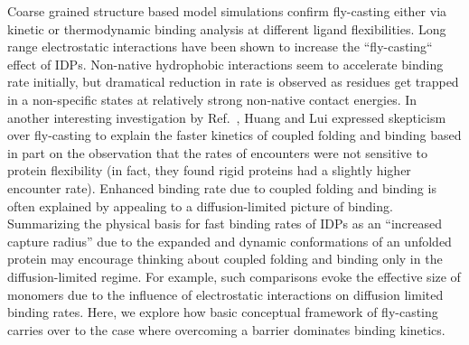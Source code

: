 \documentclass[../talant.diss.submit.tex]{subfiles}
\begin{document}
Coarse grained structure based model simulations\cite{levy:05,okazaki:06} confirm fly-casting either via kinetic or
thermodynamic binding analysis at different ligand flexibilities.
\cite{turjanski:08,huang:09,levy:04}
Long range electrostatic interactions have been shown to increase the ``fly-casting`` effect of IDPs.\cite{levy:07}
Non-native hydrophobic interactions seem to accelerate binding rate initially, but dramatical reduction in
rate is observed as residues get trapped in a non-specific states at relatively strong non-native contact
energies\cite{huang:10a}.
In another interesting investigation by Ref.~\cite{huang:09}, Huang and Lui expressed skepticism over
fly-casting to explain the faster kinetics of coupled folding and binding based in part on the observation
that the rates of encounters were not sensitive to protein flexibility (in fact, they found rigid proteins had
a slightly higher encounter rate). Enhanced binding rate due to coupled folding and binding is often explained
by appealing to a diffusion-limited picture of binding. Summarizing the physical basis for fast binding rates of
IDPs as an ``increased capture radius'' due to the expanded and dynamic conformations of an
unfolded protein\cite{shoeportman:00} may encourage thinking about coupled folding and binding
only in the diffusion-limited regime. For example, such comparisons evoke the effective size
of monomers due to the influence of electrostatic interactions on diffusion limited binding
rates. Here, we explore how basic conceptual framework of fly-casting carries over
to the case where overcoming a barrier dominates binding kinetics.
%
%
\end{document}
